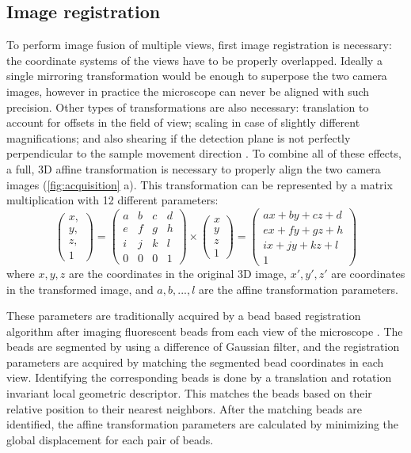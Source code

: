 \subsection{Image registration}

To perform image fusion of multiple views, first image registration is necessary: the coordinate systems of the views have to be properly overlapped. Ideally a single mirroring transformation would be enough to superpose the two camera images, however in practice the microscope can never be aligned with such precision. Other types of transformations are also necessary: translation to account for offsets in the field of view; scaling in case of slightly different magnifications; and also shearing if the detection plane is not perfectly perpendicular to the sample movement direction \cite{krzic_multiple-view_2009}. To combine all of these effects, a full, 3D affine transformation is necessary to properly align the two camera images (\autoref{fig:acquisition} a). This transformation can be represented by a matrix multiplication with 12 different parameters:
\[  
\begin{pmatrix}
x,\\
y,\\
z,\\
1
\end{pmatrix}
=
\begin{pmatrix}
a & b & c & d \\ 
e & f & g & h \\ 
i & j & k & l \\
0 & 0 & 0 & 1 
\end{pmatrix}
\times
\begin{pmatrix}
x\\
y\\
z\\
1
\end{pmatrix}
=
\begin{pmatrix}
a x + b y + c z + d\\ 
e x + f y + g z + h\\ 
i x + j y + k z + l\\
1
\end{pmatrix}
\]
where $x, y, z$ are the coordinates in the original 3D image, $x', y', z'$ are coordinates in the transformed image, and $a, b, ..., l$ are the affine transformation parameters.

These parameters are traditionally acquired by a bead based registration algorithm after imaging fluorescent beads from each view of the microscope \cite{preibisch_bead-based_2009,preibisch_software_2010}. The beads are segmented by using a difference of Gaussian filter, and the registration parameters are acquired by matching the segmented bead coordinates in each view. Identifying the corresponding beads is done by a translation and rotation invariant local geometric descriptor. This matches the beads based on their relative position to their nearest neighbors. After the matching beads are identified, the affine transformation parameters are calculated by minimizing the global displacement for each pair of beads.

